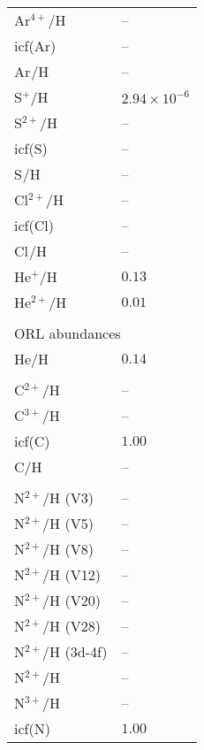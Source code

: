 \begin{longtable}[l]{ll}
 Ar$^{4+}$/H                         & -- \\
 icf(Ar)                             & -- \\
 Ar$^{}$/H                           & -- \\
 S$^{+}$/H                           & $  2.94\times 10^{ -6}$\\
 S$^{2+}$/H                          & -- \\
 icf(S)                              & -- \\
 S$^{}$/H                            & -- \\
 Cl$^{2+}$/H                         & -- \\
 icf(Cl)                             & -- \\
 Cl$^{}$/H                           & -- \\
 He$^{+}$/H                          & $  0.13$\\
 He$^{2+}$/H                         & $  0.01$\\
 \vspace{0.2cm}\\\multicolumn{2}{l}{ORL abundances}\\ \hline
 He/H                                & $  0.14$\\
 \\
 C$^{2+}$/H                          & -- \\
 C$^{3+}$/H                          & -- \\
 icf(C)                              & $  1.00$\\
 C/H                                 & -- \\
 \\
 N$^{2+}$/H (V3)                     & -- \\
 N$^{2+}$/H (V5)                     & -- \\
 N$^{2+}$/H (V8)                     & -- \\
 N$^{2+}$/H (V12)                    & -- \\
 N$^{2+}$/H (V20)                    & -- \\
 N$^{2+}$/H (V28)                    & -- \\
 N$^{2+}$/H (3d-4f)                  & -- \\
 N$^{2+}$/H                          & -- \\
 N$^{3+}$/H                          & -- \\
 icf(N)                              & $  1.00$\\

\end{longtable}
